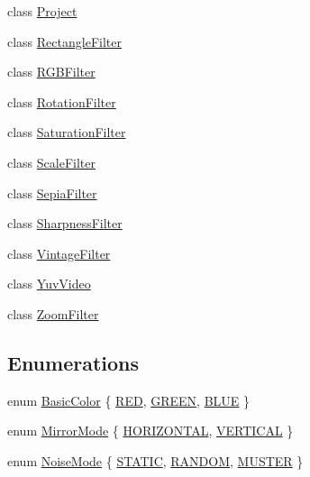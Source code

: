 \begin{DoxyCompactItemize}
class \hyperlink{classModel_1_1Project}{Project}
\item 
class \hyperlink{classModel_1_1RectangleFilter}{Rectangle\+Filter}
\item 
class \hyperlink{classModel_1_1RGBFilter}{R\+G\+B\+Filter}
\item 
class \hyperlink{classModel_1_1RotationFilter}{Rotation\+Filter}
\item 
class \hyperlink{classModel_1_1SaturationFilter}{Saturation\+Filter}
\item 
class \hyperlink{classModel_1_1ScaleFilter}{Scale\+Filter}
\item 
class \hyperlink{classModel_1_1SepiaFilter}{Sepia\+Filter}
\item 
class \hyperlink{classModel_1_1SharpnessFilter}{Sharpness\+Filter}
\item 
class \hyperlink{classModel_1_1VintageFilter}{Vintage\+Filter}
\item 
class \hyperlink{classModel_1_1YuvVideo}{Yuv\+Video}
\item 
class \hyperlink{classModel_1_1ZoomFilter}{Zoom\+Filter}
\end{DoxyCompactItemize}
\subsection*{Enumerations}
\begin{DoxyCompactItemize}
\item 
enum \hyperlink{namespaceModel_a54742b2fc8f6a246926cbb87b7fae1a4}{Basic\+Color} \{ \hyperlink{namespaceModel_a54742b2fc8f6a246926cbb87b7fae1a4af80f9a890089d211842d59625e561f88}{R\+E\+D}, 
\hyperlink{namespaceModel_a54742b2fc8f6a246926cbb87b7fae1a4aa60bd322f93178d68184e30e162571ca}{G\+R\+E\+E\+N}, 
\hyperlink{namespaceModel_a54742b2fc8f6a246926cbb87b7fae1a4a35d6719cb4d7577c031b3d79057a1b79}{B\+L\+U\+E}
 \}
\item 
enum \hyperlink{namespaceModel_a8a20195c97d8c704572b5922370c2fbc}{Mirror\+Mode} \{ \hyperlink{namespaceModel_a8a20195c97d8c704572b5922370c2fbca4dd51ad73508d6fc83a502966779e48e}{H\+O\+R\+I\+Z\+O\+N\+T\+A\+L}, 
\hyperlink{namespaceModel_a8a20195c97d8c704572b5922370c2fbca1a88641fcd39f2ed3e58a18526e97138}{V\+E\+R\+T\+I\+C\+A\+L}
 \}
\item 
enum \hyperlink{namespaceModel_a0466e3095e9c21e5864d8964e9d7df59}{Noise\+Mode} \{ \hyperlink{namespaceModel_a0466e3095e9c21e5864d8964e9d7df59ae55a36a850c67d46b3b3325de7fce0b8}{S\+T\+A\+T\+I\+C}, 
\hyperlink{namespaceModel_a0466e3095e9c21e5864d8964e9d7df59aa2b65445a3a16f164c5e811064d75726}{R\+A\+N\+D\+O\+M}, 
\hyperlink{namespaceModel_a0466e3095e9c21e5864d8964e9d7df59abdc738e06735e7d289096acf524331c0}{M\+U\+S\+T\+E\+R}
 \}
\end{DoxyCompactItemize}


